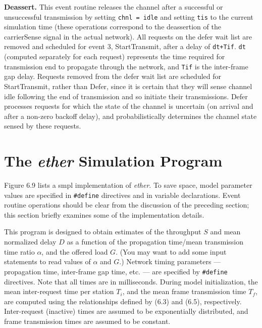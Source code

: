 \noindent\textbf{Deassert.} This event routine releases the channel after a successful or unsuccessful transmission by setting \texttt{chnl = idle} and setting \texttt{tis} to the current simulation time (these operations correspond to the deassertion of the carrierSense signal in the actual network). All requests on the defer wait list are removed and scheduled for event 3, StartTransmit, after a delay of \texttt{dt+Tif}. \texttt{dt} (computed separately for each request) represents the time required for transmission end to propagate through the network, and \texttt{Tif} is the inter-frame gap delay. Requests removed from the defer wait list are scheduled for StartTransmit, rather than Defer, since it is certain that they will sense channel idle following the end of transmission and so initiate their transmissions. Defer processes requests for which the state of the channel is uncertain (on arrival and after a non-zero backoff delay), and probabilistically determines the channel state sensed by these requests.

\section{The \emph{ether} Simulation Program}

Figure 6.9 lists a smpl implementation of \emph{ether}. To save space, model parameter values are specified in \texttt{\#define} directives and in variable declarations. Event routine operations should be clear from the discussion of the preceding section; this section briefly examines some of the implementation details.

This program is designed to obtain estimates of the throughput $S$ and mean normalized delay $D$ as a function of the propagation time/mean transmission time ratio $\alpha$, and the offered load $G$. (You may want to add some input statements to read values of $\alpha$ and $G$.) Network timing parameters --- propagation time, inter-frame gap time, etc. --- are specified by \texttt{\#define} directives. Note that all times are in milliseconds. During model initialization, the mean inter-request time per station $T_i$, and the mean frame transmission time $T_f$, are computed using the relationships defined by (6.3) and (6.5), respectively. Inter-request (inactive) times are assumed to be exponentially distributed, and frame transmission times are assumed to be constant.

